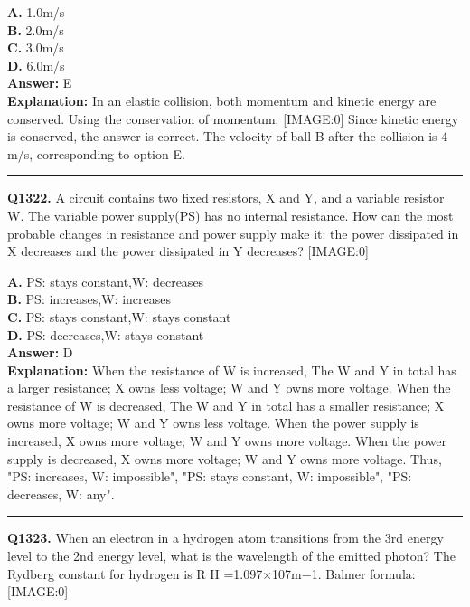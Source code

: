 \documentclass[12pt]{article}
\begin{document}
\textbf{A.} 1.0m/s \\
\textbf{B.} 2.0m/s \\
\textbf{C.} 3.0m/s \\
\textbf{D.} 6.0m/s \\

\textbf{Answer:} E \\
\textbf{Explanation:} In an elastic collision, both momentum and kinetic energy are conserved. Using the conservation of momentum:
[IMAGE:0]
Since kinetic energy is conserved, the answer is correct. The velocity of ball B after the collision is 4 m/s, corresponding to option E.

\hrule
\vspace{1em}


\noindent
\textbf{Q1322.} A circuit contains two fixed resistors, X and Y, and a variable resistor W. The variable power supply(PS) has no internal resistance.
How can the most probable changes in resistance and power supply make it: the power dissipated in X decreases and the power dissipated in Y decreases?
[IMAGE:0]



\textbf{A.} PS: stays constant,W: decreases \\
\textbf{B.} PS: increases,W: increases \\
\textbf{C.} PS: stays constant,W: stays constant \\
\textbf{D.} PS: decreases,W: stays constant \\

\textbf{Answer:} D \\
\textbf{Explanation:} When the resistance of W is increased, The W and Y in total has a larger resistance; X owns less voltage; W and Y owns more voltage.
When the resistance of W is decreased, The W and Y in total has a smaller resistance; X owns more voltage; W and Y owns less voltage.
When the power supply is increased, X owns more voltage; W and Y owns more voltage.
When the power supply is decreased, X owns more voltage; W and Y owns more voltage.
Thus, "PS: increases, W: impossible", "PS: stays constant, W: impossible", "PS: decreases, W: any".

\hrule
\vspace{1em}


\noindent
\textbf{Q1323.} When an electron in a hydrogen atom transitions from the 3rd energy level to the 2nd energy level, what is the wavelength of the emitted photon? The Rydberg constant for hydrogen is R
H
​=1.097×107m−1.
Balmer formula:
[IMAGE:0]
\end{document}

